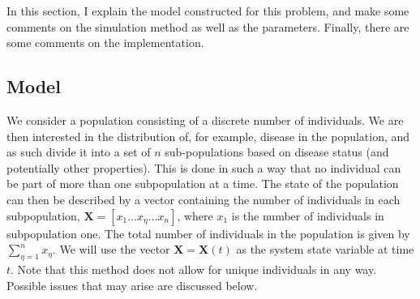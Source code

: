 \documentclass[10pt,a4paper]{article}
\begin{document}
In this section, I explain the model constructed for this problem, and make some comments on the simulation method as well as the parameters. Finally, there are some comments on the implementation.

%
%


\subsection{Model}

We consider a population consisting of a discrete number of individuals. We are then interested in the distribution of, for example, disease in the population, and as such divide it into a set of $n$ sub-populations based on disease status (and potentially other properties). This is done in such a way that no individual can be part of more than one subpopulation at a time. The state of the population can then be described by a vector containing the number of individuals in each subpopulation, $\bm{X} = \left[ x_1 \ldots x_\eta \ldots x_n\right]$, where $x_1$ is the number of individuals in subpopulation one. The total number of individuals in the population is given by $\sum_{\eta = 1}^n x_{\eta}$. We will use the vector $\bm{X} = \bm{X} \left( t \right)$ as the system state variable at time $t$. Note that this method does not allow for unique individuals in any way. Possible issues that may arise are discussed below.
\end{document}
